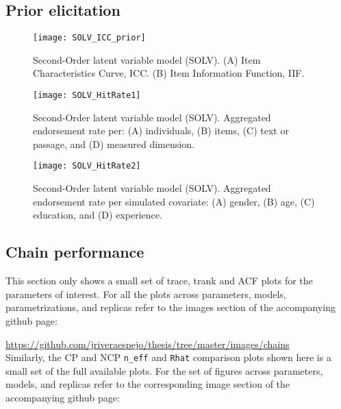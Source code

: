 \subsection{Prior elicitation}
%
\begin{figure}[H]
	\centering
	\texttt{[image: SOLV\_ICC\_prior]}
	\caption[Second-Order latent variable model (SOLV). Item Characteristic Curve (ICC) and Item Information Function (IIF).]%
	{Second-Order latent variable model (SOLV). (A) Item Characteristics Curve, ICC. (B) Item Information Function, IIF.}
	\label{fig:SOLV_ICC_prior}
\end{figure}
%
\begin{figure}[H]
	\centering
	\texttt{[image: SOLV\_HitRate1]}
	\caption[Second-Order latent variable model (SOLV). Hit rate per dimensions of interest.]%
	{Second-Order latent variable model (SOLV). Aggregated endorsement rate per: (A) individuals, (B) items, (C) text or passage, and (D) measured dimension.}
	\label{fig:SOLV_hitrate1}
\end{figure}
%
\begin{figure}[H]
	\centering
	\texttt{[image: SOLV\_HitRate2]}
	\caption[Second-Order latent variable model (SOLV). Hit rate per simulated covariate.]%
	{Second-Order latent variable model (SOLV). Aggregated endorsement rate per simulated covariate: (A) gender, (B) age, (C) education, and (D) experience.}
	\label{fig:SOLV_hitrate2}
\end{figure}


\subsection{Chain performance}

This section only shows a small set of trace, trank and ACF plots for the parameters of interest. For all the plots across parameters, models, parametrizations, and replicas refer to the images section of the accompanying github page:

\noindent \url{https://github.com/jriveraespejo/thesis/tree/master/images/chains} \\

\noindent Similarly, the CP and NCP \texttt{n\_eff} and \texttt{Rhat} comparison plots shown here is a small set of the full available plots. For the set of figures across parameters, models, and replicas refer to the corresponding image section of the accompanying github page:

